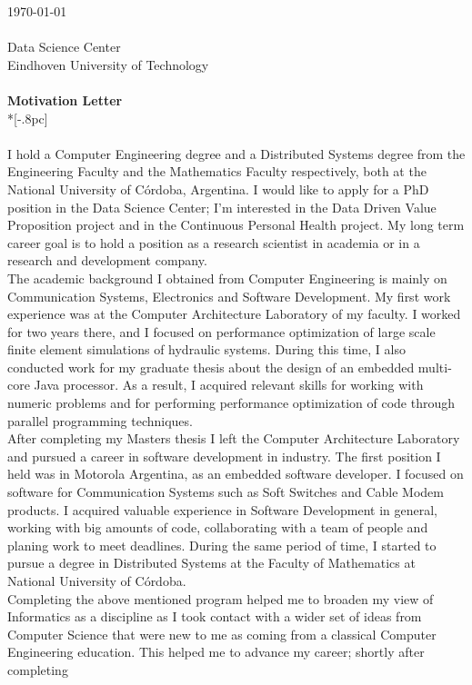 \documentclass[letter,12pt,english]{article}
\begin{document}
{ \hfill \today \\ \\ 
Data Science Center\\
Eindhoven University of Technology\\
\\
\large
\bf Motivation Letter} \\*[-.8pc]
\\
\\
I hold a Computer Engineering degree and a Distributed Systems degree from the Engineering Faculty
and the Mathematics Faculty respectively, both at the National University of C\'ordoba, Argentina.
I would like to apply for a PhD position in the Data Science Center; I'm interested in the Data Driven Value Proposition project and in the Continuous Personal Health project. My long term career goal is to hold a position as a research scientist in academia or in a research and development company.\\
The academic background I obtained from Computer Engineering is mainly on Communication Systems,
Electronics and Software Development. My first work experience was at the Computer 
Architecture Laboratory of my faculty. I worked for two years there, and I focused on performance
optimization of large scale finite element simulations of hydraulic systems. During this time, I 
also conducted work for my graduate thesis about the design of an embedded multi-core Java processor.
As a result, I acquired relevant skills for working with numeric problems and for
performing performance optimization of code through parallel programming techniques.
\\
After completing my Masters thesis I left the Computer Architecture Laboratory and pursued a career
in software development in industry. The first position I held was in Motorola Argentina, as an embedded
software developer. I focused on software for Communication Systems such as Soft Switches and Cable Modem
products. I acquired valuable experience in Software Development in general, working with big amounts of
code, collaborating with a team of people and planing work to meet deadlines. During the same period of 
time, I started to pursue a degree in Distributed Systems at the Faculty of Mathematics at National 
University of C\'ordoba.
\\
Completing the above mentioned program helped me to broaden my view of Informatics as a discipline
as I took contact with a wider set of ideas from Computer Science that were new to me as coming from
a classical Computer Engineering education. This helped me to advance my career; shortly after completing 
\end{document}
